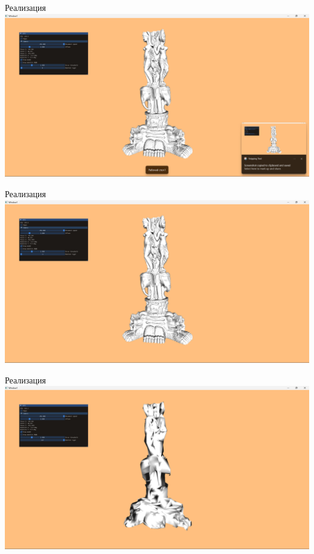 \begin{frame}{Реализация}
    \includegraphics[width=\textwidth]{demo-0.png}
\end{frame}

\begin{frame}{Реализация}
    \includegraphics[width=\textwidth]{demo-1.png}
\end{frame}

\begin{frame}{Реализация}
    \includegraphics[width=\textwidth]{demo-2.png}
\end{frame}
